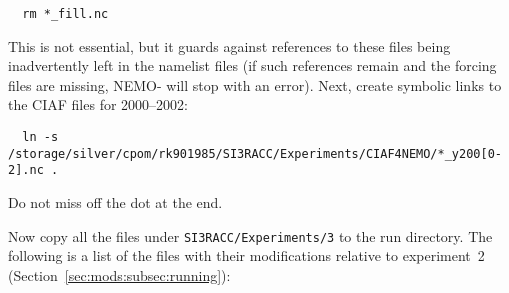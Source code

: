 \begin{verbatim}
  rm *_fill.nc
\end{verbatim}

\noindent{}This is not essential, but it guards against references to these files being inadvertently left in the namelist files (if such references remain and the forcing files are missing, NEMO-\SIcu{} will stop with an error).
Next, create symbolic links to the CIAF files for 2000--2002:

\begin{verbatim}
  ln -s /storage/silver/cpom/rk901985/SI3RACC/Experiments/CIAF4NEMO/*_y200[0-2].nc .
\end{verbatim}

\noindent{}Do not miss off the dot at the end.

Now copy all the files under \verb|SI3RACC/Experiments/3| to the run directory.
The following is a list of the files with their modifications relative to experiment~2 (Section~\ref{sec:mods:subsec:running}):

